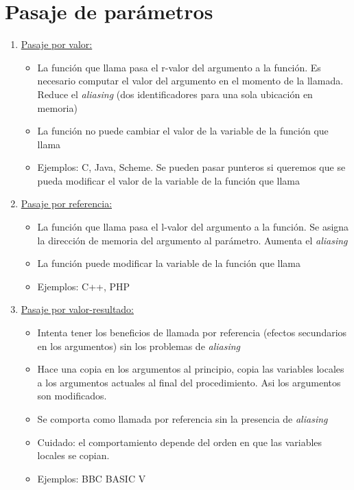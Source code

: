 \documentclass[10pt,a4paper]{report}
\begin{document}
\section{Pasaje de parámetros}
\begin{enumerate}
	\item \underline{Pasaje por valor:} 
	\begin{itemize}
	\item La función que llama pasa el r-valor del argumento a la función. Es 
	necesario computar el valor del argumento en el momento de la llamada. 
	Reduce el \textit{aliasing} (dos identificadores para una sola ubicación en 
	memoria)
	\item  La función no puede cambiar el valor de la variable de la función 
	que llama
	\item Ejemplos: C, Java, Scheme. Se pueden pasar punteros si queremos 
	que se pueda modificar el valor de la variable de la función que llama
	\end{itemize}

	\item \underline{Pasaje por referencia:}
	\begin{itemize}
	\item La función que llama pasa el l-valor del argumento a la función. Se 
	asigna la dirección de memoria del argumento al parámetro. Aumenta el 
	\textit{aliasing}
	\item La función puede modificar la variable de la función que llama
	\item Ejemplos: C++, PHP
	\end{itemize}

	\item \underline{Pasaje por valor-resultado:}
	\begin{itemize}
	\item Intenta tener los beneficios de llamada por referencia (efectos 
	secundarios en los argumentos) sin los problemas de \textit{aliasing}
	\item Hace una copia en los argumentos al principio, copia las variables 
	locales a los argumentos actuales al final del procedimiento. Asi los 
	argumentos son modificados.
	\item Se comporta como llamada por referencia sin la presencia de 	
	\textit{aliasing}
	\item Cuidado: el comportamiento depende del orden en que las 
	variables locales se copian.
	\item Ejemplos: BBC BASIC V
	\end{itemize}
	

\end{enumerate}
\end{document}
